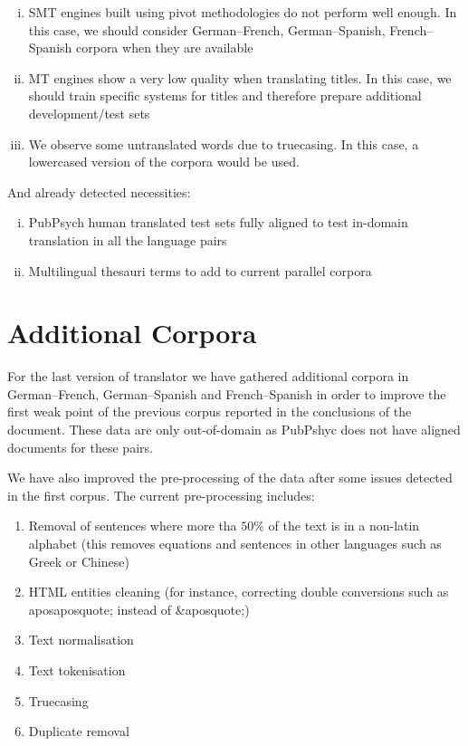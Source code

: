 \documentclass[a4paper,11pt]{article}
\begin{document}
\begin{enumerate}[(i)]
\itemsep0em 
 \item SMT engines built using pivot methodologies do not perform well enough. In this case, we should consider German--French, German--Spanish, French--Spanish corpora when they are available
 \item MT engines show a very low quality when translating titles. In this case, we should train specific systems for titles and therefore prepare additional development/test sets
 \item We observe some untranslated words due to truecasing. In this case, a lowercased version of the corpora would be used.
\end{enumerate}

And already detected necessities:
\begin{enumerate}[(i)]
\itemsep0em 
 \item PubPsych human translated test sets fully aligned to test in-domain translation in all the language pairs
 \item Multilingual thesauri terms to add to current parallel corpora
\end{enumerate}


\appendix                                     
\section{Additional Corpora}

For the last version of translator we have gathered additional corpora in  German--French, German--Spanish and French--Spanish in order to improve the first weak point of the previous corpus reported in the conclusions of the document. These data are only out-of-domain as PubPshyc does not have aligned documents for these pairs.

We have also improved the pre-processing of the data after some issues detected in the first corpus. The current pre-processing includes:

\begin{enumerate}
\itemsep0em 
 \item Removal of sentences where more tha $50\%$ of the text is in a non-latin alphabet (this removes equations and sentences in other languages such as Greek or Chinese)
 \item HTML entities cleaning (for instance, correcting double conversions such as aposaposquote; instead of \&aposquote;)
 \item Text normalisation
 \item Text tokenisation
 \item Truecasing
 \item Duplicate removal
\end{enumerate}
\end{document}
